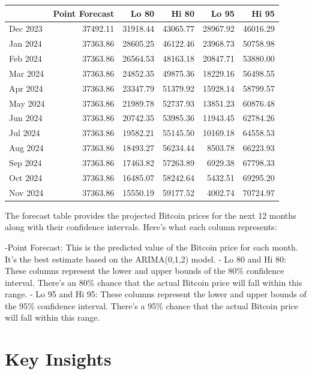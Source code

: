 \documentclass[
]{book}
\begin{document}
\begin{table}
\centering\begingroup\fontsize{12}{14}\selectfont

\begin{tabular}{l|r|r|r|r|r}
\hline
  & Point Forecast & Lo 80 & Hi 80 & Lo 95 & Hi 95\\
\hline
Dec 2023 & 37492.11 & 31918.44 & 43065.77 & 28967.92 & 46016.29\\
\hline
Jan 2024 & 37363.86 & 28605.25 & 46122.46 & 23968.73 & 50758.98\\
\hline
Feb 2024 & 37363.86 & 26564.53 & 48163.18 & 20847.71 & 53880.00\\
\hline
Mar 2024 & 37363.86 & 24852.35 & 49875.36 & 18229.16 & 56498.55\\
\hline
Apr 2024 & 37363.86 & 23347.79 & 51379.92 & 15928.14 & 58799.57\\
\hline
May 2024 & 37363.86 & 21989.78 & 52737.93 & 13851.23 & 60876.48\\
\hline
Jun 2024 & 37363.86 & 20742.35 & 53985.36 & 11943.45 & 62784.26\\
\hline
Jul 2024 & 37363.86 & 19582.21 & 55145.50 & 10169.18 & 64558.53\\
\hline
Aug 2024 & 37363.86 & 18493.27 & 56234.44 & 8503.78 & 66223.93\\
\hline
Sep 2024 & 37363.86 & 17463.82 & 57263.89 & 6929.38 & 67798.33\\
\hline
Oct 2024 & 37363.86 & 16485.07 & 58242.64 & 5432.51 & 69295.20\\
\hline
Nov 2024 & 37363.86 & 15550.19 & 59177.52 & 4002.74 & 70724.97\\
\hline
\end{tabular}
\endgroup{}
\end{table}

The forecast table provides the projected Bitcoin prices for the next 12 months along with their confidence intervals. Here's what each column represents:

-Point Forecast: This is the predicted value of the Bitcoin price for each month. It's the best estimate based on the ARIMA(0,1,2) model.
- Lo 80 and Hi 80: These columns represent the lower and upper bounds of the 80\% confidence interval. There's an 80\% chance that the actual Bitcoin price will fall within this range.
- Lo 95 and Hi 95: These columns represent the lower and upper bounds of the 95\% confidence interval. There's a 95\% chance that the actual Bitcoin price will fall within this range.

\section{Key Insights}\label{key-insights}
\end{document}
